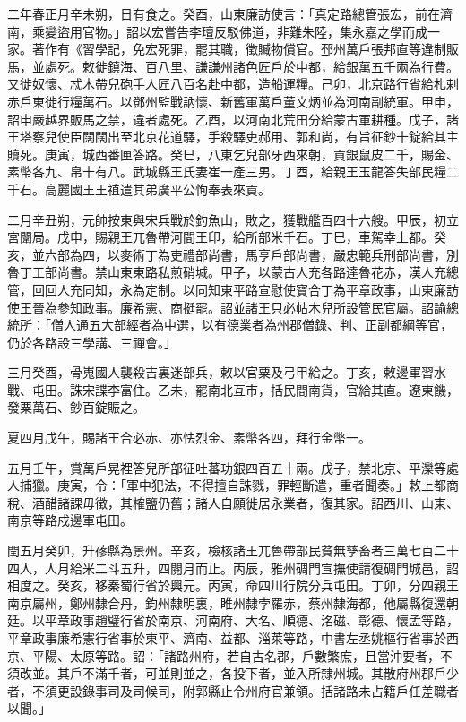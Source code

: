 
\begin{pinyinscope}

 二年春正月辛未朔，日有食之。癸酉，山東廉訪使言：「真定路總管張宏，前在濟南，乘變盜用官物。」詔以宏嘗告李璮反駁佛道，非難朱陸，集永嘉之學而成一家。著作有《習學記，免宏死罪，罷其職，徵贓物償官。邳州萬戶張邦直等違制販馬，並處死。敕徙鎮海、百八里、謙謙州諸色匠戶於中都，給銀萬五千兩為行費。又徙奴懷、忒木帶兒砲手人匠八百名赴中都，造船運糧。己卯，北京路行省給札剌赤戶東徙行糧萬石。以鄧州監戰訥懷、新舊軍萬戶董文炳並為河南副統軍。甲申，詔申嚴越界販馬之禁，違者處死。乙酉，以河南北荒田分給蒙古軍耕種。戊子，諸王塔察兒使臣闊闊出至北京花道驛，手殺驛吏郝用、郭和尚，有旨征鈔十錠給其主贖死。庚寅，城西番匣答路。癸巳，八東乞兒部牙西來朝，貢銀鼠皮二千，賜金、素幣各九、帛十有八。武城縣王氏妻崔一產三男。丁酉，給親王玉龍答失部民糧二千石。高麗國王王禃遣其弟廣平公恂奉表來貢。



 二月辛丑朔，元帥按東與宋兵戰於釣魚山，敗之，獲戰艦百四十六艘。甲辰，初立宮闈局。戊申，賜親王兀魯帶河間王印，給所部米千石。丁巳，車駕幸上都。癸亥，並六部為四，以麥術丁為吏禮部尚書，馬亨戶部尚書，嚴忠範兵刑部尚書，別魯丁工部尚書。禁山東東路私煎硝堿。甲子，以蒙古人充各路達魯花赤，漢人充總管，回回人充同知，永為定制。以同知東平路宣慰使寶合丁為平章政事，山東廉訪使王晉為參知政事。廉希憲、商挺罷。詔並諸王只必帖木兒所設管民官屬。詔諭總統所：「僧人通五大部經者為中選，以有德業者為州郡僧錄、判、正副都綱等官，仍於各路設三學講、三禪會。」



 三月癸酉，骨嵬國人襲殺吉裏迷部兵，敕以官粟及弓甲給之。丁亥，敕邊軍習水戰、屯田。誅宋諜李富住。乙未，罷南北互市，括民間南貨，官給其直。遼東饑，發粟萬石、鈔百錠賑之。



 夏四月戊午，賜諸王合必赤、亦怯烈金、素幣各四，拜行金幣一。



 五月壬午，賞萬戶晃裡答兒所部征吐蕃功銀四百五十兩。戊子，禁北京、平灤等處人捕獵。庚寅，令：「軍中犯法，不得擅自誅戮，罪輕斷遣，重者聞奏。」敕上都商稅、酒醋諸課毋徵，其榷鹽仍舊；諸人自願徙居永業者，復其家。詔西川、山東、南京等路戍邊軍屯田。



 閏五月癸卯，升蓚縣為景州。辛亥，檢核諸王兀魯帶部民貧無孳畜者三萬七百二十四人，人月給米二斗五升，四閱月而止。丙辰，雅州碉門宣撫使請復碉門城邑，詔相度之。癸亥，移秦蜀行省於興元。丙寅，命四川行院分兵屯田。丁卯，分四親王南京屬州，鄭州隸合丹，鈞州隸明裏，睢州隸孛羅赤，蔡州隸海都，他屬縣復還朝廷。以平章政事趙璧行省於南京、河南府、大名、順德、洺磁、彰德、懷孟等路，平章政事廉希憲行省事於東平、濟南、益都、淄萊等路，中書左丞姚樞行省事於西京、平陽、太原等路。詔：「諸路州府，若自古名郡，戶數繁庶，且當沖要者，不須改並。其戶不滿千者，可並則並之，各投下者，並入所隸州城。其散府州郡戶少者，不須更設錄事司及司候司，附郭縣止令州府官兼領。括諸路未占籍戶任差職者以聞。」




\end{pinyinscope}

